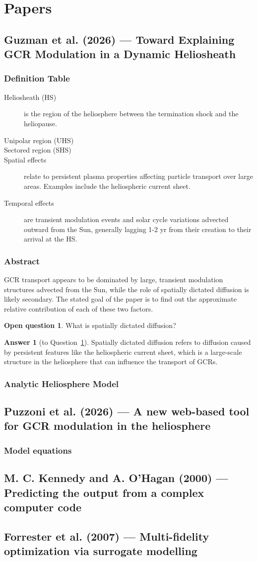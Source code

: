 \documentclass[11pt]{article}
\newcommand{\standing}[1]{\clearpage\section{#1}}
\newcommand{\paper}[1]{\clearpage\subsection{#1}}
\newcommand{\subsubentry}[1]{\subsubsection{#1}}
\theoremstyle{definition}
\newtheorem{question}{Open question}
\newtheorem*{answer}{Answer}
\begin{document}
\standing{Papers}
\localtableofcontents

\paper{Guzman et al. (2026) --- Toward Explaining GCR Modulation in a Dynamic Heliosheath}

\subsubentry{Definition Table}
\begin{description}
  \item[Heliosheath (HS)] is the region of the heliosphere between the termination shock and the heliopause.
  \item[Unipolar region (UHS)] 
  \item[Sectored region (SHS)] 
  \item[Spatial effects] relate to persistent plasma properties affecting particle transport over large areas. Examples 
  include the heliospheric current sheet.
  \item[Temporal effects] are transient modulation events and solar cycle variations advected outward
    from the Sun, generally lagging 1-2 yr from their creation to their arrival
    at the HS.
\end{description}

\subsubentry{Abstract}
GCR transport appears to be dominated by large, transient modulation structures
advected from the Sun, while the role of spatially dictated diffusion is likely secondary.
The stated goal of the paper is to find out the approximate relative contribution of each of these two 
factors.
\begin{question}\label{q:spatial}
What is spatially dictated diffusion?
\end{question}

\begin{answer}[to Question~\ref{q:spatial}]
Spatially dictated diffusion refers to diffusion caused by persistent features like the 
heliospheric current sheet, which is a large-scale structure in the heliosphere 
that can influence the transport of GCRs. 
\end{answer}

\subsubentry{Analytic Heliosphere Model}


\paper{Puzzoni et al. (2026) --- A new web-based tool for GCR modulation in the heliosphere}
\subsubentry{Model equations}

\paper{M. C. Kennedy and A. O'Hagan (2000) --- Predicting the output from a complex computer code}

\paper{Forrester et al. (2007) --- Multi-fidelity optimization via surrogate modelling}
\end{document}
